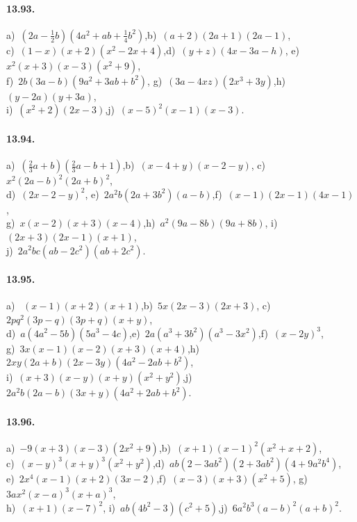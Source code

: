 \paragraph{13.93.} a)~$\left(2a-\frac{1}{2}b\right)\left(4a^{2}+{ab}+\frac{1}{4}b^{2}\right)$,\quad b)~$(a+2)\left(2a+1\right)\left(2a-1\right)$,\quad \protect\\
c)~$(1-x)\left(x+2\right)\left(x^{2}-2x+4\right)$,\quad d)~$(y+z)(4x-3a-h)$,\quad
e)~$x^{2}(x+3)(x-3)\left(x^{2}+9\right)$,\protect\\
f)~$2b(3a-b)\left(9a^{2}+3{ab}+b^{2}\right)$,\quad
g)~$(3a-4{xz})\left(2x^{3}+3y\right)$,\quad h)~$(y-2a)\left(y+3a\right)$,\quad \protect\\
i)~$\left(x^{2}+2\right)(2x-3)$,\quad j)~$(x-5)^{2}(x-1)(x-3)$.

\paragraph{13.94.} a)~$\left(\frac{2}{3}a+b\right)\left(\frac{2}{3}a-b+1\right)$,\quad b)~$(x-4+y)(x-2-y)$,\quad
c)~$x^{2}(2a-b)^{2}(2a+b)^{2}$,\protect\\
d)~$(2x-2-y)^{2}$,\quad
e)~$2a^{2}b(2a+3b^{2})(a-b)$,\quad f)~$(x-1)(2x-1)(4x-1)$,\quad \protect\\
g)~$x(x-2)(x+3)(x-4)$,\quad h)~$a^{2}(9a-8b)(9a+8b)$,\quad
i)~$(2x+3)(2x-1)(x+1)$,\protect\\
j)~$2a^{2}{bc}({ab}-2c^{2})({ab}+2c^{2})$.

\paragraph{13.95.} a)~ $(x-1)(x+2)(x+1)$,\quad b)~$5x(2x-3)(2x+3)$,\quad
c)~$2{pq}^{2}(3p-q)(3p+q)(x+y)$,\protect\\
d)~$a(4a^{2}-5b)(5a^{3}-4c)$,\quad e)~$2a(a^{3}+3b^{2})(a^{3}-3x^{2})$,\quad f)~$(x-2y)^{3}$,\quad \protect\\
g)~$3x(x-1)(x-2)(x+3)(x+4)$,\quad h)~$2xy(2a+b)(2x-3y)(4a^{2}-2{ab}+b^{2})$,\quad \protect\\
i)~$(x+3)(x-y)(x+y)(x^{2}+y^{2})$,\quad j)~$2a^{2}b(2a-b)(3x+y)(4a^{2}+2{ab}+b^{2})$.

\paragraph{13.96.} a)~$-9(x+3)(x-3)(2x^{2}+9)$,\quad b)~$(x+1)(x-1)^{2}(x^{2}+x+2)$,\quad \protect\\
c)~$(x-y)^{3}(x+y)^{3}(x^{2}+y^{2})$,\quad d)~${ab}(2-3{ab}^{2})(2+3{ab}^{2})(4+9a^{2}b^{4})$,\quad \protect\\
e)~$2x^{4}(x-1)(x+2)(3x-2)$,\quad f)~$(x-3)(x+3)(x^{2}+5)$,\quad
g)~$3ax^{2}(x-a)^{3}(x+a)^{3}$,\protect\\
h)~$(x+1)(x-7)^{2}$,\quad
i)~${ab}(4b^{2}-3)(c^{2}+5)$,\quad j)~$6a^{2}b^{3}(a-b)^{2}(a+b)^{2}$.

